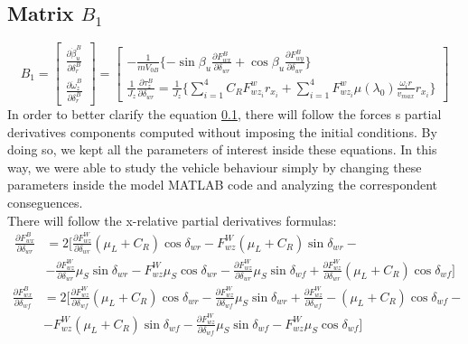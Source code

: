 \documentclass[a4paper,12pt,titlepage]{report}
\begin{document}
	\subsection{Matrix $B_{1}$} \label{B1}
		\begin{equation}
			B_{1}=
			\begin{bmatrix} 
				\frac{\partial\dot{\beta}_{u}^{B}}{\partial\delta_{r}^{B}} \\
				\frac{\partial\dot{\omega}_{z}^{B}}{\partial\delta_{r}^{B}}
			\end{bmatrix} = 
			\begin{bmatrix}
				-\frac{1}{mV_{0B}}\{-\sin\beta_{u}\frac{\partial F_{wx}^{B}}{\partial \delta_{wr}} + \cos\beta_{u}\frac{\partial F_{wy}^{B}}{\partial \delta_{wr}}\}  \\
				\frac{1}{J_{z}} \frac{\partial \tau_{z}^{B}}{\partial\delta_{wr}} = \frac{1}{J_{z}} \{ \sum\limits_{i=1}^4 C_{R}F_{wz_{i}}^{w} r_{x_{i}} + \sum\limits_{i=1}^4 F_{wz_{i}}^{w} \mu(\lambda_{0}) \frac{\omega_{i} r}{v_{max}}r_{x_{i}} \}
			\end{bmatrix}
		\end{equation} 
	In order to better clarify the equation \ref{B1}, there will follow the forces s partial derivatives components computed without imposing the initial conditions. By doing so, we kept all the parameters of interest inside these equations. In this way, we were able to study the vehicle behaviour simply by changing these parameters inside the model MATLAB code and analyzing the correspondent conseguences. \\ There will follow the x-relative partial derivatives formulas: 
		\begin{equation} \label{Fwx su deltaR }
			\begin{split}
				\frac{\partial F_{wx}^{B}}{\partial \delta_{wr}} &= 2 [\frac{\partial F_{wz}^{W}}{\partial \delta_{wr}} (\mu_{L}+C_{R}) \cos\delta_{wr} - F_{wz}^{W} (\mu_{L}+C_{R})\sin\delta_{wr} - \\
				&- \frac{\partial F_{wz}^{W}}{\partial \delta_{wr}} \mu_{S} \sin \delta_{wr} - F_{wz}^{W} \mu_{S}\cos\delta_{wr} - \frac{\partial F_{wz}^{W}}{\partial \delta_{wr}} \mu_{S} \sin \delta_{wf} + \frac{\partial F_{wz}^{W}}{\partial \delta_{wr}} (\mu_{L}+C_{R}) \cos\delta_{wf}]
			\end{split}
		\end{equation}
		\begin{equation} \label{Fwx su deltaF}
			\begin{split}
				\frac{\partial F_{wx}^{B}}{\partial \delta_{wf}} &= 2 [\frac{\partial F_{wz}^{W}}{\partial \delta_{wf}} (\mu_{L}+C_{R}) \cos\delta_{wr} - \frac{\partial F_{wz}^{W}}{\partial \delta_{wf}} \mu_{S} \sin \delta_{wr} + \frac{\partial F_{wz}^{W}}{\partial \delta_{wf}} - (\mu_{L}+C_{R}) \cos\delta_{wf} - \\
				&- F_{wz}^{W} (\mu_{L}+C_{R})\sin\delta_{wf}
				- \frac{\partial F_{wz}^{W}}{\partial \delta_{wf}} \mu_{S} \sin \delta_{wf} - F_{wz}^{W} \mu_{S}\cos\delta_{wf}]
			\end{split}
		\end{equation}
\end{document}
